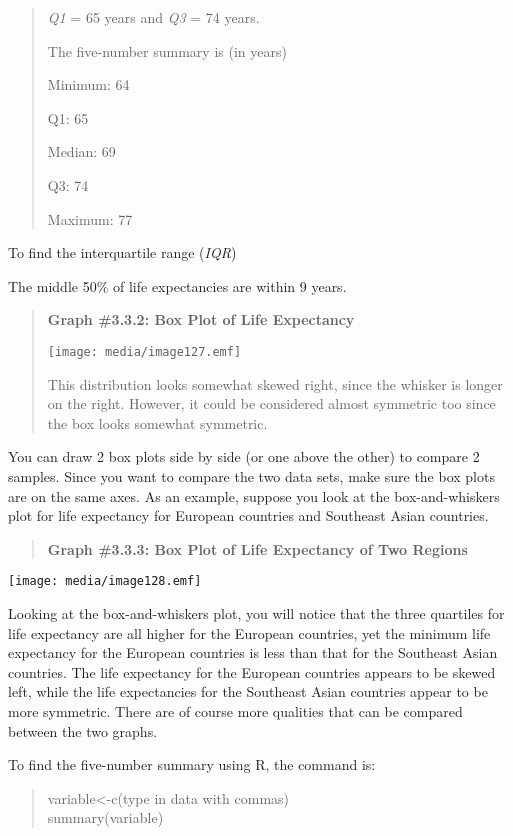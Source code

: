 \documentclass[]{book}
\begin{document}
\begin{quote}
\emph{Q1} = 65 years and \emph{Q3} = 74 years.

The five-number summary is (in years)

Minimum: 64

Q1: 65

Median: 69

Q3: 74

Maximum: 77
\end{quote}

To find the interquartile range (\emph{IQR})

The middle 50\% of life expectancies are within 9 years.

\begin{quote}
\textbf{Graph \#3.3.2: Box Plot of Life Expectancy}

\texttt{[image: media/image127.emf]}

This distribution looks somewhat skewed right, since the whisker is
longer on the right. However, it could be considered almost symmetric
too since the box looks somewhat symmetric.
\end{quote}

You can draw 2 box plots side by side (or one above the other) to
compare 2 samples. Since you want to compare the two data sets, make
sure the box plots are on the same axes. As an example, suppose you look
at the box-and-whiskers plot for life expectancy for European countries
and Southeast Asian countries.

\begin{quote}
\textbf{Graph \#3.3.3: Box Plot of Life Expectancy of Two Regions}
\end{quote}

\texttt{[image: media/image128.emf]}

Looking at the box-and-whiskers plot, you will notice that the three
quartiles for life expectancy are all higher for the European countries,
yet the minimum life expectancy for the European countries is less than
that for the Southeast Asian countries. The life expectancy for the
European countries appears to be skewed left, while the life
expectancies for the Southeast Asian countries appear to be more
symmetric. There are of course more qualities that can be compared
between the two graphs.

To find the five-number summary using R, the command is:

\begin{quote}
variable\textless{}-c(type in data with commas)\\
summary(variable)
\end{quote}
\end{document}
